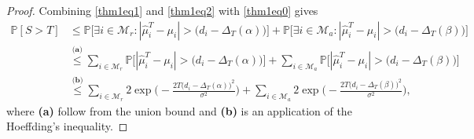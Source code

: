 \documentclass[12pt]{article}
\def\P{\mathbb{P}}
\def\MM{\mathcal{M}}
\begin{document}
\begin{proof}
Combining \eqref{thm1eq1} and \eqref{thm1eq2} with \eqref{thm1eq0} gives
$$\begin{aligned}
\P[S>T]
& \leq \P\Big[\exists i\in\MM_r: |\hat\mu^T_i-\mu_i|>\big(d_i - \Delta_T(\alpha)\big)\Big] + \P\Big[\exists i\in\MM_a: |\hat\mu^T_i-\mu_i|>\big(d_i - \Delta_T(\beta)\big)\Big] \\
&\stackrel{\textbf{(a)}}{\leq} \sum_{i\in\MM_r} \P\Big[|\hat\mu^T_i-\mu_i|>\big(d_i - \Delta_T(\alpha)\big)\Big] +  \sum_{i\in\MM_a} \P\Big[|\hat\mu^T_i-\mu_i|>\big(d_i - \Delta_T(\beta)\big)\Big] \\
&\stackrel{\textbf{(b)}}{\leq} \sum_{i\in\MM_r} 2\exp\bigg(-\frac{2T\big(d_i - \Delta_T(\alpha)\big)^2}{\sigma^2}\bigg) + \sum_{i\in\MM_a} 2\exp\bigg(-\frac{2T\big(d_i - \Delta_T(\beta)\big)^2}{\sigma^2}\bigg),
\end{aligned}$$
where {\bf (a)} follow from the union bound and {\bf (b)}  is an application of the Hoeffding's inequality. 
\end{proof}
\end{document}
